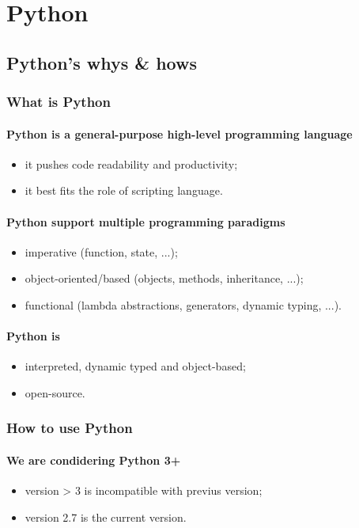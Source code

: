 \section{Python}
\subsection{Python's whys \& hows}
\subsubsection{What is Python}
\paragraph{Python is a general-purpose high-level programming language}
\begin{itemize}
	\item it pushes code readability and productivity;
	\item it best fits the role of scripting language.
	\end{itemize}
\paragraph{Python support multiple programming paradigms}
\begin{itemize}
	\item imperative (function, state, ...);
	\item object-oriented/based (objects, methods, inheritance, ...);
	\item functional (lambda abstractions, generators, dynamic typing, ...).
\end{itemize}
\paragraph{Python is}
\begin{itemize}
	\item interpreted, dynamic typed and object-based;
	\item open-source.
\end{itemize}
\subsubsection{How to use Python}	
\paragraph{We are condidering Python 3+}
\begin{itemize}
	\item version > 3 is incompatible with previus version;
	\item version 2.7 is the current version.
\end{itemize}
